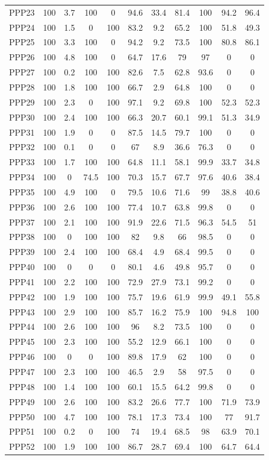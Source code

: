 \documentclass[authoryearcitations]{UoYCSproject}
\begin{document}
\begin{appendices}
\begin{table}[H]
\begin{tabular}{|l|c|c|c|c|c|c|c|c|c|c|}
PPP23&100&3.7&100&0&94.6&33.4&81.4&100&94.2&96.4\\
PPP24&100&1.5&0&100&83.2&9.2&65.2&100&51.8&49.3\\
PPP25&100&3.3&100&0&94.2&9.2&73.5&100&80.8&86.1\\
PPP26&100&4.8&100&0&64.7&17.6&79&97&0&0\\
PPP27&100&0.2&100&100&82.6&7.5&62.8&93.6&0&0\\
PPP28&100&1.8&100&100&66.7&2.9&64.8&100&0&0\\
PPP29&100&2.3&0&100&97.1&9.2&69.8&100&52.3&52.3\\
PPP30&100&2.4&100&100&66.3&20.7&60.1&99.1&51.3&34.9\\
PPP31&100&1.9&0&0&87.5&14.5&79.7&100&0&0\\
PPP32&100&0.1&0&0&67&8.9&36.6&76.3&0&0\\
PPP33&100&1.7&100&100&64.8&11.1&58.1&99.9&33.7&34.8\\
PPP34&100&0&74.5&100&70.3&15.7&67.7&97.6&40.6&38.4\\
PPP35&100&4.9&100&0&79.5&10.6&71.6&99&38.8&40.6\\
PPP36&100&2.6&100&100&77.4&10.7&63.8&99.8&0&0\\
PPP37&100&2.1&100&100&91.9&22.6&71.5&96.3&54.5&51\\
PPP38&100&0&100&100&82&9.8&66&98.5&0&0\\
PPP39&100&2.4&100&100&68.4&4.9&68.4&99.5&0&0\\
PPP40&100&0&0&0&80.1&4.6&49.8&95.7&0&0\\
PPP41&100&2.2&100&100&72.9&27.9&73.1&99.2&0&0\\
PPP42&100&1.9&100&100&75.7&19.6&61.9&99.9&49.1&55.8\\
PPP43&100&2.9&100&100&85.7&16.2&75.9&100&94.8&100\\
PPP44&100&2.6&100&100&96&8.2&73.5&100&0&0\\
PPP45&100&2.3&100&100&55.2&12.9&66.1&100&0&0\\
PPP46&100&0&0&100&89.8&17.9&62&100&0&0\\
PPP47&100&2.3&100&100&46.5&2.9&58&97.5&0&0\\
PPP48&100&1.4&100&100&60.1&15.5&64.2&99.8&0&0\\
PPP49&100&2.6&100&100&83.2&26.6&77.7&100&71.9&73.9\\
PPP50&100&4.7&100&100&78.1&17.3&73.4&100&77&91.7\\
PPP51&100&0.2&0&100&74&19.4&68.5&98&63.9&70.1\\
PPP52&100&1.9&100&100&86.7&28.7&69.4&100&64.7&64.4\\

\end{tabular}
\end{table}
\end{appendices}
\end{document}
